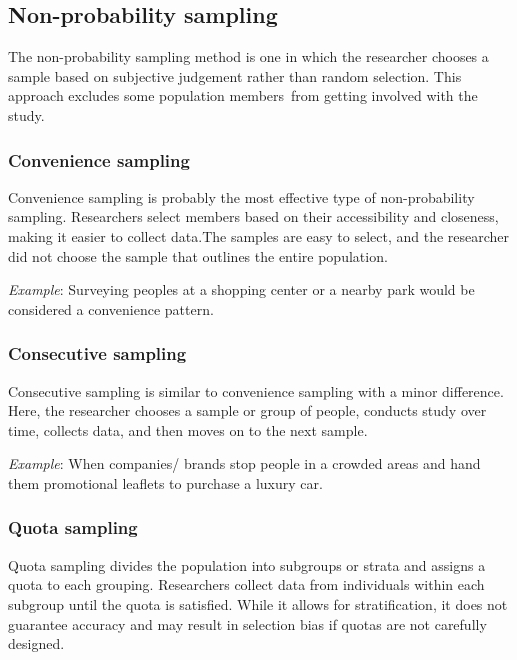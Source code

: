 \documentclass[
]{book}
\begin{document}
\hypertarget{non-probability-sampling}{%
\subsection{Non-probability sampling}\label{non-probability-sampling}}

The non-probability sampling method is one in which the researcher chooses a sample based on subjective judgement rather than random selection. This approach excludes some population members~from getting involved with the study.

\hypertarget{convenience-sampling}{%
\subsubsection{Convenience sampling}\label{convenience-sampling}}

Convenience sampling is probably the most effective type of non-probability sampling. Researchers select members based on their accessibility and closeness, making it easier to collect data.The samples are easy to select, and the researcher did not choose the sample that outlines the entire population.

\emph{Example}: Surveying peoples at a shopping center or a nearby park would be considered a convenience pattern.

\hypertarget{consecutive-sampling}{%
\subsubsection{Consecutive sampling}\label{consecutive-sampling}}

Consecutive sampling is similar to convenience sampling with a minor difference. Here, the researcher chooses a sample or group of people, conducts study over time, collects data, and then moves on to the next sample.

\emph{Example}: When companies/ brands stop people in a crowded areas and hand them promotional leaflets to purchase a luxury car.

\hypertarget{quota-sampling}{%
\subsubsection{Quota sampling}\label{quota-sampling}}

Quota sampling divides the population into subgroups or strata and assigns a quota to each grouping. Researchers collect data from individuals within each subgroup until the quota is satisfied. While it allows for stratification, it does not guarantee accuracy and may result in selection bias if quotas are not carefully designed.
\end{document}
